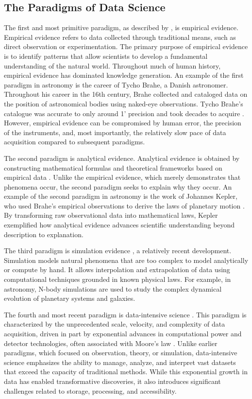 \documentclass[preprint,linenumbers, longauthor]{aastex631}
\begin{document}
\subsection{The Paradigms of Data Science}
The first and most primitive paradigm, as described by \cite{heyFourthParadigmDataIntensive2009}, is empirical evidence. 
Empirical evidence refers to data collected through traditional means, such as direct observation or experimentation. 
The primary purpose of empirical evidence is to identify patterns that allow scientists to develop a fundamental understanding of the natural world. 
Throughout much of human history, empirical evidence has dominated knowledge generation. 
An example of the first paradigm in astronomy is the career of Tycho Brahe, a Danish astronomer. Throughout his career in the 16th century, Brahe collected and cataloged data on the position of astronomical bodies using naked-eye observations. Tycho Brahe's catalogue was accurate to only around 1' precision and took decades to acquire \citep{verbuntThreeEditionsStar2010}.
However, empirical evidence can be compromised by human error, the precision of the instruments, and, most importantly, the relatively slow pace of data acquisition compared to subsequent paradigms.

The second paradigm is analytical evidence. Analytical evidence is obtained by constructing mathematical formulas and theoretical frameworks based on empirical data \cite{heyFourthParadigmDataIntensive2009}. 
Unlike the empirical evidence, which merely demonstrates that phenomena occur, the second paradigm seeks to explain why they occur. 
An example of the second paradigm in astronomy is the work of Johannes Kepler, who used Brahe's empirical observations to derive the laws of planetary motion \citep{heyFourthParadigmDataIntensive2009}. 
By transforming raw observational data into mathematical laws, Kepler exemplified how analytical evidence advances scientific understanding beyond description to explanation.

The third paradigm is simulation evidence \cite{heyFourthParadigmDataIntensive2009}, a relatively recent development. Simulation models natural phenomena that are too complex to model analytically or compute by hand. 
It allows interpolation and extrapolation of data using computational techniques grounded in known physical laws. 
For example, in astronomy, N-body simulations are used to study the complex dynamical evolution of planetary systems and galaxies. 

The fourth and most recent paradigm is data-intensive science \cite{heyFourthParadigmDataIntensive2009}. 
This paradigm is characterized by the unprecedented scale, velocity, and complexity of data acquisition, driven in part by exponential advances in computational power and detector technologies, often associated with Moore's law \cite{heyFourthParadigmDataIntensive2009}. 
Unlike earlier paradigms, which focused on observation, theory, or simulation, data-intensive science emphasizes the ability to manage, analyze, and interpret vast datasets that exceed the capacity of traditional methods. 
While this exponential growth in data has enabled transformative discoveries, it also introduces significant challenges related to storage, processing, and accessibility. 
\end{document}
